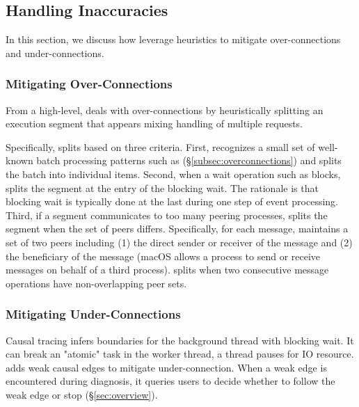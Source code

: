 \subsection{Handling Inaccuracies} \label{subsec:handle}

In this section, we discuss how \xxx leverage heuristics to mitigate
over-connections and under-connections.

\subsubsection{Mitigating Over-Connections}\label{subsec:fix-over}

From a high-level, \xxx deals with over-connections by heuristically splitting
an execution segment that appears mixing handling of multiple requests.

Specifically, \xxx splits based on three criteria. First, \xxx recognizes a small
set of well-known batch processing patterns such as 
(\S\ref{subsec:overconnections}) and splits the batch into individual items. Second,
when a wait operation such as  blocks, \xxx splits the segment at the
entry of the blocking wait. The rationale is that blocking wait is typically
done at the last during one step of event processing. Third, if a segment
communicates to too many peering processes, \xxx splits the segment when the
set of peers differs. Specifically, for each message, \xxx maintains a set
of two peers including (1) the direct sender or receiver of the message and
(2) the beneficiary of the message (macOS allows a process to send or receive
messages on behalf of a third process). \xxx splits when two consecutive message
operations have non-overlapping peer sets.

\subsubsection{Mitigating Under-Connections}\label{subsec:fix-under}

Causal tracing infers boundaries for the background thread with blocking wait.
It can break an "atomic" task in the worker thread, \eg a thread pauses for IO
resource. \xxx adds weak causal edges to mitigate under-connection. When a weak
edge is encountered during diagnosis, it queries users to decide whether to
follow the weak edge or stop (\S\ref{sec:overview}).

